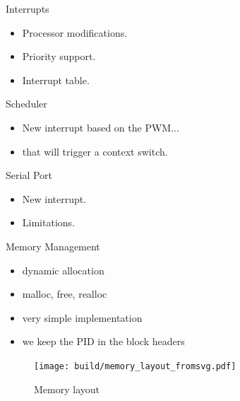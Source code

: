 \documentclass{beamer}
\begin{document}
    \begin{frame}{Interrupts}
      \begin{itemize}
        \item Processor modifications.
        \item Priority support.
        \item Interrupt table.
      \end{itemize}
    \end{frame}

    \begin{frame}{Scheduler}
      \begin{itemize}
        \item New interrupt based on the PWM...
        \item that will trigger a context switch.
      \end{itemize}
    \end{frame}

    \begin{frame}{Serial Port}
      \begin{itemize}
        \item New interrupt.
        \item Limitations.
      \end{itemize}
    \end{frame}

    \begin{frame}{Memory Management}
      \begin{itemize}
        \item dynamic allocation
        \item malloc, free, realloc
        \item very simple implementation
        \item we keep the PID in the block headers
      \end{itemize}
    \end{frame}

    \begin{frame}[plain]
      \begin{figure}
        \begin{minipage}[c]{0.5\textwidth}
          \caption{Memory layout}
        \end{minipage}\hfill
        \begin{minipage}[c]{0.5\textwidth}
          \texttt{[image: build/memory\_layout\_fromsvg.pdf]}
        \end{minipage}
      \end{figure}
    \end{frame}
\end{document}
